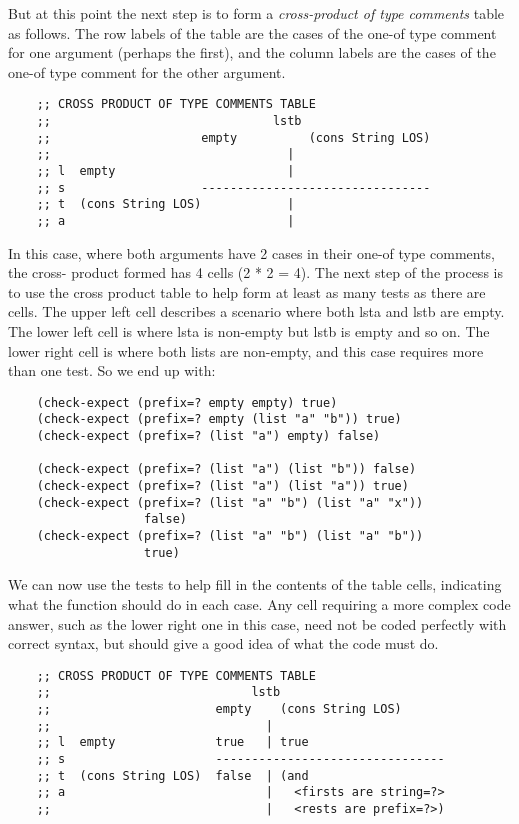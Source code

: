 \documentclass[11pt,a4paper]{report}
\begin{document}
	But at this point the next step is to form a \emph{cross-product of type comments} table as follows. The
	row labels of the table are the cases of the one-of type comment for one argument (perhaps the
	first), and the column labels are the cases of the one-of type comment for the other argument.
	\clearpage
	\begin{verbatim}
	;; CROSS PRODUCT OF TYPE COMMENTS TABLE
	;;                               lstb
	;;                     empty          (cons String LOS)
	;;                                 |
	;; l  empty                        |
	;; s                   --------------------------------
	;; t  (cons String LOS)            |
	;; a                               |
	\end{verbatim}
	
	In this case, where both arguments have 2 cases in their one-of type comments, the cross-
	product formed has 4 cells (2 * 2 = 4). The next step of the process is to use the cross product
	table to help form at least as many tests as there are cells. The upper left cell describes a
	scenario where both lsta and lstb are empty. The lower left cell is where lsta is non-empty but
	lstb is empty and so on. The lower right cell is where both lists are non-empty, and this case
	requires more than one test. So we end up with:
	
	\begin{verbatim}
	(check-expect (prefix=? empty empty) true)
	(check-expect (prefix=? empty (list "a" "b")) true)
	(check-expect (prefix=? (list "a") empty) false)
	
	(check-expect (prefix=? (list "a") (list "b")) false)
	(check-expect (prefix=? (list "a") (list "a")) true)
	(check-expect (prefix=? (list "a" "b") (list "a" "x"))
	               false)
	(check-expect (prefix=? (list "a" "b") (list "a" "b"))
	               true)
	\end{verbatim}
	
	We can now use the tests to help fill in the contents of the table cells, indicating what the function
	should do in each case. Any cell requiring a more complex code answer, such as the lower right
	one in this case, need not be coded perfectly with correct syntax, but should give a good idea of
	what the code must do.
	
	\begin{verbatim}
	;; CROSS PRODUCT OF TYPE COMMENTS TABLE
	;;                            lstb
	;;                       empty    (cons String LOS)
	;;                              |
	;; l  empty              true   | true   
	;; s                     --------------------------------
	;; t  (cons String LOS)  false  | (and
	;; a                            |   <firsts are string=?>
	;;                              |   <rests are prefix=?>)
	\end{verbatim}
	
\end{document}
